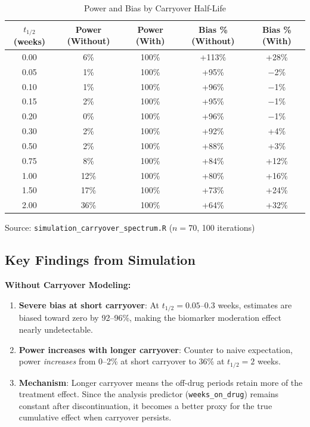 \documentclass[11pt,a4paper]{article}
\begin{document}
\begin{table}[H]
\centering
\caption{Power and Bias by Carryover Half-Life}
\label{tab:power-bias}
\begin{tabular}{@{}ccccc@{}}
\toprule
$t_{1/2}$ (weeks) & Power (Without) & Power (With) & Bias \% (Without) & Bias \% (With) \\
\midrule
0.00 & 6\% & 100\% & +113\% & +28\% \\
0.05 & 1\% & 100\% & +95\% & $-$2\% \\
0.10 & 1\% & 100\% & +96\% & $-$1\% \\
0.15 & 2\% & 100\% & +95\% & $-$1\% \\
0.20 & 0\% & 100\% & +96\% & $-$1\% \\
0.30 & 2\% & 100\% & +92\% & +4\% \\
0.50 & 2\% & 100\% & +88\% & +3\% \\
0.75 & 8\% & 100\% & +84\% & +12\% \\
1.00 & 12\% & 100\% & +80\% & +16\% \\
1.50 & 17\% & 100\% & +73\% & +24\% \\
2.00 & 36\% & 100\% & +64\% & +32\% \\
\bottomrule
\end{tabular}

\smallskip
\footnotesize{Source: \texttt{simulation\_carryover\_spectrum.R} ($n=70$, 100 iterations)}
\end{table}

\subsection{Key Findings from Simulation}

\textbf{Without Carryover Modeling:}

\begin{enumerate}
    \item \textbf{Severe bias at short carryover}: At $t_{1/2} = 0.05$--$0.3$ weeks, estimates are
          biased toward zero by 92--96\%, making the biomarker moderation effect
          nearly undetectable.

    \item \textbf{Power increases with longer carryover}: Counter to naive expectation,
          power \textit{increases} from 0--2\% at short carryover to 36\% at $t_{1/2} = 2$ weeks.

    \item \textbf{Mechanism}: Longer carryover means the off-drug periods retain more
          of the treatment effect. Since the analysis predictor (\texttt{weeks\_on\_drug})
          remains constant after discontinuation, it becomes a better proxy for
          the true cumulative effect when carryover persists.
\end{enumerate}
\end{document}
